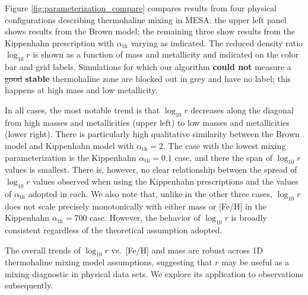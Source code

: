 %
%
Figure \ref{fig:parameterization_compare} compares results from four physical configurations describing thermohaline mixing in MESA: the upper left panel shows results from the Brown model; the remaining three show results from the Kippenhahn prescription with $\alpha_{\text{th}}$ varying as indicated. The reduced density ratio $\log_{10} r$ is shown as a function of mass and metallicity and indicated on the color bar and grid labels.
Simulations for which our algorithm \textbf{could not} measure a \sout{good} \textbf{stable} thermohaline zone are blocked out in grey and have no label; this happens at high mass and low metallicity.
%

In all cases, the most notable trend is that $\log_{10} r$ decreases along the diagonal from high masses and metallicities (upper left) to low masses and metallicities (lower right). 
There is particularly high qualitative similarity between the Brown model and Kippenhahn model with $\alpha_{\text{th}} = 2$. 
The case with the lowest mixing parameterization is the Kippenhahn $\alpha_{\text{th}} = 0.1$ case, and there the span of $\log_{10} r$ values is smallest. There is, however, no clear relationship between the spread of $\log_{10} r$ values observed when using the Kippenhahn prescriptions and the values of $\alpha_{\text{th}}$ adopted in each. 
We also note that, unlike in the other three cases, $\log_{10} r$ does not scale precisely monotonically with either mass or [Fe/H] in the Kippenhahn $\alpha_{\text{th}} = 700$ case. 
However, the behavior of $\log_{10} r$ is broadly consistent regardless of the theoretical assumption adopted.

The overall trends of $\log_{10} r$ vs.~[Fe/H] and mass are  
robust across 1D thermohaline mixing model assumptions, suggesting that $r$ may be useful as a mixing diagnostic in physical data sets. We explore its application to observations subsequently.


